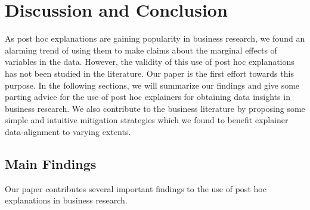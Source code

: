 \documentclass[12pt]{article}  %
\begin{document}
\section{Discussion and Conclusion}
    \label{sec:discussion}
    As post hoc explanations are gaining popularity in business research, we found an alarming trend of using them to make claims about the marginal effects of variables in the data.  However, the validity of this use of post hoc explanations has not been studied in the literature. 
    Our paper is the first effort towards this purpose. 
     In the following sections, we will summarize our findings and give some parting advice for the use of post hoc explainers for obtaining data insights in business research. 
    We also contribute to the business literature by proposing some simple and intuitive mitigation strategies which we found to benefit explainer data-alignment to varying extents.


    \subsection{Main Findings}
        Our paper contributes several important findings to the use of post hoc explanations in business research.
\end{document}
